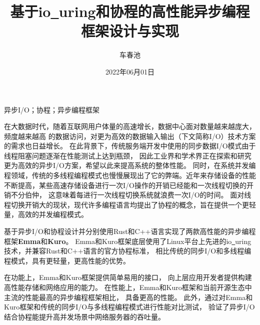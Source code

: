 \documentclass[supercite]{HustGraduPaper}
\title{基于io\underline{~}uring和协程的高性能异步编程框架设计与实现}
\author{车春池}
\date{2022年06月01日}
\theoremstyle{definition}
\begin{document}
\maketitle

\statement

\clearpage


\begin{cnabstract}{异步I/O；协程；异步编程框架}

在大数据时代，随着互联网用户体量的高速增长，数据中心面对数量越来越庞大，频度越来越高
的数据访问，对更为高效的数据输入输出（下文简称I/O）技术方案的需求也日益增长。
在此背景下，传统服务端开发中使用的同步数据I/O模式由于线程阻塞问题逐渐在性能测试上达到瓶颈，
因此工业界和学术界正在探索和研究更为高效的异步I/O方案，希望以此来提高系统的整体性能。
同时，在系统并发编程领域，传统的多线程编程模式也慢慢展现出了它的弊端。近年来存储设备的性能
不断提高，某些高速存储设备进行一次I/O操作的开销已经能和一次线程切换的开销不分伯仲，
这意味着每进行一次线程切换系统就浪费一次I/O的时间。
面对线程切换开销大的现状，现代许多编程语言均提出了协程的概念，旨在提供一个更轻量，高效的并发编程模式。\par

基于异步I/O和协程设计并分别使用Rust和C++语言实现了两款高性能的异步编程框架\textbf{Emma}和\textbf{Kuro}。
Emma和Kuro框架底层使用了Linux平台上先进的io\underline{~}uring技术，并兼容Rust和C++语言的官方协程标准，
相比传统的同步I/O和多线程编程模式，具有更轻量，更高性能的优势。\par

在功能上，Emma和Kuro框架提供简单易用的接口，
向上层应用开发者提供构建高性能存储和网络应用的能力。
在性能上，Emma和Kuro框架和当前开源生态中主流的性能最高的异步编程框架相比，
具备更高的性能。
此外，通过对Emma和Kuro框架和传统的同步I/O与多线程编程模式进行性能对比测试，
验证了异步I/O结合协程能提升高并发场景中网络服务器的吞吐量。\par

\end{cnabstract}
\end{document}
